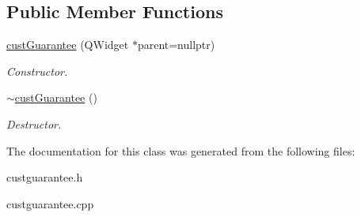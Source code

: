 \subsection*{Public Member Functions}
\begin{DoxyCompactItemize}
\item 
\mbox{\label{classcust_guarantee_ad4a1fbde7c9422147f6b0a15e1abe930}} 
\mbox{\hyperlink{classcust_guarantee_ad4a1fbde7c9422147f6b0a15e1abe930}{cust\+Guarantee}} (Q\+Widget $\ast$parent=nullptr)
\begin{DoxyCompactList}\small\item\em Constructor. \end{DoxyCompactList}\item 
\mbox{\label{classcust_guarantee_a2fb1d22a1052a21ae5ff15589dad2c27}} 
\mbox{\hyperlink{classcust_guarantee_a2fb1d22a1052a21ae5ff15589dad2c27}{$\sim$cust\+Guarantee}} ()
\begin{DoxyCompactList}\small\item\em Destructor. \end{DoxyCompactList}\end{DoxyCompactItemize}


The documentation for this class was generated from the following files\+:\begin{DoxyCompactItemize}
\item 
custguarantee.\+h\item 
custguarantee.\+cpp\end{DoxyCompactItemize}
